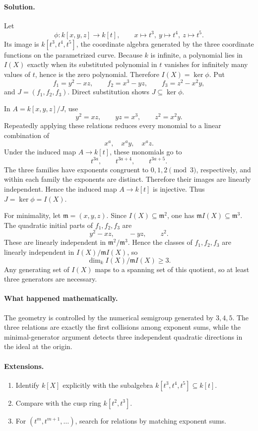 \paragraph{Solution.}
Let
\[
\phi:k[x,y,z]\to k[t],\qquad
x\mapsto t^3,\ y\mapsto t^4,\ z\mapsto t^5.
\]
Its image is \(k[t^3,t^4,t^5]\), the coordinate algebra generated by the three coordinate
functions on the parametrized curve.  Because \(k\) is infinite, a polynomial lies in \(I(X)\)
exactly when its substituted polynomial in \(t\) vanishes for infinitely many values of \(t\), hence
is the zero polynomial.  Therefore \(I(X)=\ker\phi\).  Put
\[
f_1=y^2-xz,\qquad f_2=x^3-yz,\qquad f_3=z^2-x^2y,
\]
and \(J=(f_1,f_2,f_3)\).  Direct substitution shows \(J\subseteq\ker\phi\).

In \(A=k[x,y,z]/J\), use
\[
y^2=xz,\qquad yz=x^3,\qquad z^2=x^2y.
\]
Repeatedly applying these relations reduces every monomial to a linear combination of
\[
x^a,\quad x^a y,\quad x^a z.
\]
Under the induced map \(A\to k[t]\), these monomials go to
\[
t^{3a},\qquad t^{3a+4},\qquad t^{3a+5}.
\]
The three families have exponents congruent to \(0,1,2\pmod3\), respectively, and within
each family the exponents are distinct.  Therefore their images are linearly independent.
Hence the induced map \(A\to k[t]\) is injective.  Thus \(J=\ker\phi=I(X)\).

For minimality, let \(\mathfrak m=(x,y,z)\).  Since \(I(X)\subseteq\mathfrak m^2\), one has
\(\mathfrak m I(X)\subseteq\mathfrak m^3\).  The quadratic initial parts of \(f_1,f_2,f_3\)
are
\[
y^2-xz,\qquad -yz,\qquad z^2.
\]
These are linearly independent in \(\mathfrak m^2/\mathfrak m^3\).  Hence the classes of
\(f_1,f_2,f_3\) are linearly independent in \(I(X)/\mathfrak m I(X)\), so
\[
\dim_k I(X)/\mathfrak m I(X)\ge3.
\]
Any generating set of \(I(X)\) maps to a spanning set of this quotient, so at least three
generators are necessary.

\paragraph{What happened mathematically.}
The geometry is controlled by the numerical semigroup generated by \(3,4,5\).  The three
relations are exactly the first collisions among exponent sums, while the minimal-generator
argument detects three independent quadratic directions in the ideal at the origin.

\begin{center}
\end{center}

\paragraph{Extensions.}
\begin{enumerate}
\item Identify \(k[X]\) explicitly with the subalgebra \(k[t^3,t^4,t^5]\subseteq k[t]\).
\item Compare with the cusp ring \(k[t^2,t^3]\).
\item For \((t^m,t^{m+1},\dots)\), search for relations by matching exponent sums.
\end{enumerate}
\fi
